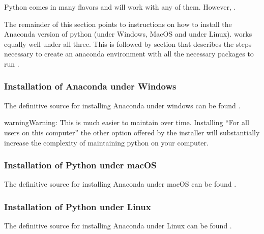 \documentclass[letterpaper,10pt,english]{jupyterBook}
\begin{document}
\sphinxAtStartPar
Python comes in many flavors and  will work with any of them.  However, .

\sphinxAtStartPar
The remainder of this section points to instructions on how to install the Anaconda version of python (under Windows, MacOS and under Linux).  works equally well under all three. This is followed by section that describes the steps necessary to create an anaconda environment with all the necessary packages to run .


\subsubsection{Installation of Anaconda under Windows}
\label{\detokenize{content/03_Installation/InstallingPython:installation-of-anaconda-under-windows}}
\sphinxAtStartPar
The definitive source for installing Anaconda under windows can be found .

\begin{sphinxadmonition}{warning}{Warning:}
\sphinxAtStartPar
{}  This is much easier to maintain over time.  Installing “For all users on this computer” the other option offered by the  installer   will substantially increase the complexity of maintaining python on your computer.
\end{sphinxadmonition}


\subsubsection{Installation of Python under macOS}
\label{\detokenize{content/03_Installation/InstallingPython:installation-of-python-under-macos}}
\sphinxAtStartPar
The definitive source for installing Anaconda under macOS can be found .


\subsubsection{Installation of Python under Linux}
\label{\detokenize{content/03_Installation/InstallingPython:installation-of-python-under-linux}}
\sphinxAtStartPar
The definitive source for installing Anaconda under Linux can be found .
\end{document}
